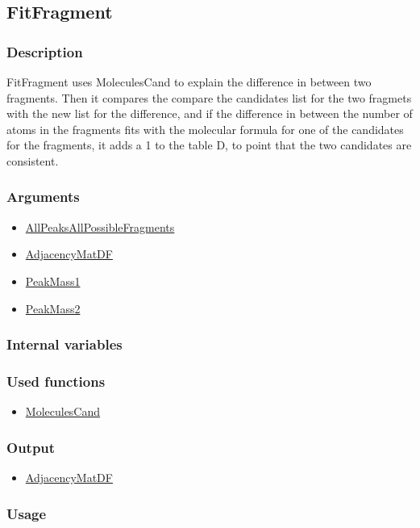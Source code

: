 \subsection{FitFragment}\label{FitFragment}
\subsubsection{Description}
FitFragment uses MoleculesCand to explain the difference in between two fragments. Then it compares the compare the candidates list for the two fragmets with the new list for the difference, and if the difference in between the number of atoms in the fragments fits with the molecular formula for one of the candidates for the fragments, it adds a 1 to the table D, to point that the two candidates are consistent.
\subsubsection{Arguments}
\begin{itemize}
\item \hyperref[AllPeaksAllPossibleFragments]{AllPeaksAllPossibleFragments}
\item \hyperref[AdjacencyMatDF]{AdjacencyMatDF}
\item \hyperref[PeakMass]{PeakMass1}
\item \hyperref[PeakMass]{PeakMass2}
\end{itemize}
\subsubsection{Internal variables}
\subsubsection{Used functions}
\begin{itemize}
\item \hyperref[MoleculesCand]{MoleculesCand}
\end{itemize}
\subsubsection{Output}
\begin{itemize}
\item \hyperref[AdjacencyMatDF]{AdjacencyMatDF}
\end{itemize}
\subsubsection{Usage}



